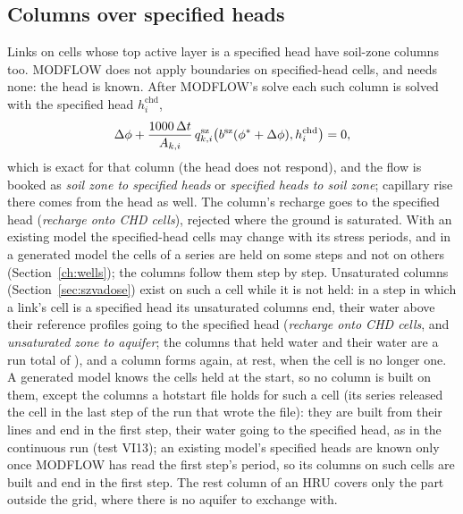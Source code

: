 \subsection{Columns over specified heads}\label{sec:szchd}
Links on cells whose top active layer is a specified head have soil-zone columns too. MODFLOW does not apply
boundaries on specified-head cells, and needs none: the head is known. After MODFLOW's solve each such column is
solved with the specified head $h^{\mathrm{chd}}_i$,
\begin{equation}
\Delta\phi+\frac{1000\,\Delta t}{A_{k,i}}\,q^{\mathrm{sz}}_{k,i}\big(b^{\mathrm{sz}}(\phi^*+\Delta\phi),h^{\mathrm{chd}}_i\big)=0,
\end{equation}
which is exact for that column (the head does not respond), and the flow is booked as \emph{soil zone to specified
heads} or \emph{specified heads to soil zone}; capillary rise there comes from the head as well. The column's recharge
goes to the specified head (\emph{recharge onto CHD cells}), rejected where the ground is saturated. With an existing
model the specified-head cells may change with its stress periods, and in a generated model the cells of a
 series are held on some steps and not on others (Section~\ref{ch:wells}); the columns follow them step
by step. Unsaturated columns (Section~\ref{sec:szvadose}) exist on such a cell while it is not held: in a step in which a
link's cell is a specified head its unsaturated columns end, their water above their reference profiles going to the
specified head (\emph{recharge onto CHD cells}, and \emph{unsaturated zone to aquifer}; the columns that held water and
their water are a run total of ), and a column forms again, at rest, when the cell is no longer
one. A generated model knows the cells held at the start, so no column is built on them, except the columns a hotstart
file holds for such a cell (its series released the cell in the last step of the run that wrote the file): they are
built from their lines and end in the first step, their water going to the specified head, as in the continuous run
(test VI13); an existing model's specified
heads are known only once MODFLOW has read the first step's period, so its columns on such cells are built and end in the
first step. The
rest column of an HRU covers only the part outside the grid, where there is no aquifer to exchange with.

